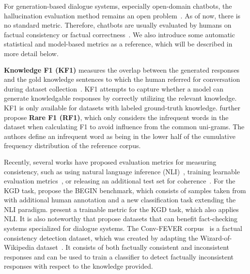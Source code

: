 For generation-based dialogue systems, especially open-domain chatbots, the hallucination evaluation method remains an open problem~. As of now, there is no standard metric. Therefore, chatbots are usually evaluated by humans on factual consistency or factual correctness~. We also introduce some automatic statistical and model-based metrics as a reference, which will be described in more detail below.

\textbf{Knowledge F1 (KF1)} measures the overlap between the generated responses and the gold knowledge sentences to which the human referred for conversation during dataset collection~. 
KF1 attempts to capture whether a model can generate knowledgable responses by correctly utilizing the relevant knowledge. 
KF1 is only available for datasets with labeled ground-truth knowledge.  further propose \textbf{Rare F1 (RF1)}, which only considers the infrequent words in the dataset when calculating F1 to avoid influence from the common uni-grams. The authors define an infrequent word as being in the lower half of the cumulative frequency distribution of the reference corpus.

Recently, several works have proposed evaluation metrics for measuring consistency, such as using natural language inference (NLI)~, training learnable evaluation metrics~, or releasing an additional test set for coherence~.
For the KGD task,  propose the BEGIN benchmark, which consists of samples taken from  with additional human annotation and a new classification task extending the NLI paradigm.  present a trainable metric for the KGD task, which also applies NLI. It is also noteworthy that  propose datasets that can benefit fact-checking systems specialized for dialogue systems.
The Conv-FEVER corpus~ is a factual consistency detection dataset, which was created by adapting the Wizard-of-Wikipedia dataset~. It consists of both factually consistent and inconsistent responses and can be used to train a classifier to detect factually inconsistent responses with respect to the knowledge provided.

